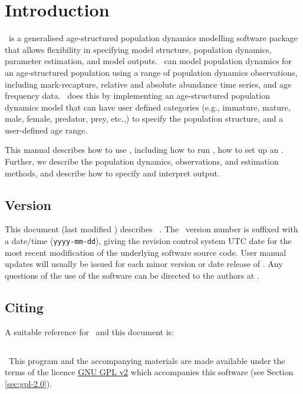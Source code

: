 \section{Introduction\label{sec:Introduction}}
\CNAME\ is a generalised age-structured population dynamics modelling software package that allows flexibility in specifying model structure, population dynamics, parameter estimation, and model outputs. \CNAME\ can model population dynamics for an age-structured population using a range of population dynamics observations, including mark-recapture, relative and absolute abundance time series, and age frequency data. \CNAME\ does this by implementing an age-structured population dynamics model that can have user defined categories (e.g., immature, mature, male, female, predator, prey, etc.,) to specify the population structure, and a user-defined age range. 

This manual describes how to use \CNAME, including how to run \CNAME, how to set up an \config. Further, we describe the population dynamics, observations, and estimation methods, and describe how to specify and interpret output. 

\subsection{Version\label{sec:version}}
This document (last modified \DocVer) describes \CNAME\ \VER. The \CNAME\ version number is suffixed with a date/time (\texttt{yyyy-mm-dd}), giving the revision control system UTC date for the most recent modification of the underlying software source code. User manual updates will usually be issued for each minor version or date release of \CNAME. Any questions of the use of the software can be directed to the authors at \email. 

\subsection{Citing \CNAME}
A suitable reference for \CNAME\ and this document is:

\ManualRef{}

\subsection{}
\
This program and the accompanying materials are made available under the terms of the licence \href{http://www.gnu.org/licenses/old-licenses/gpl-2.0.en.html}{GNU GPL v2} which accompanies this software (see Section \ref{sec:gpl-2.0}).

